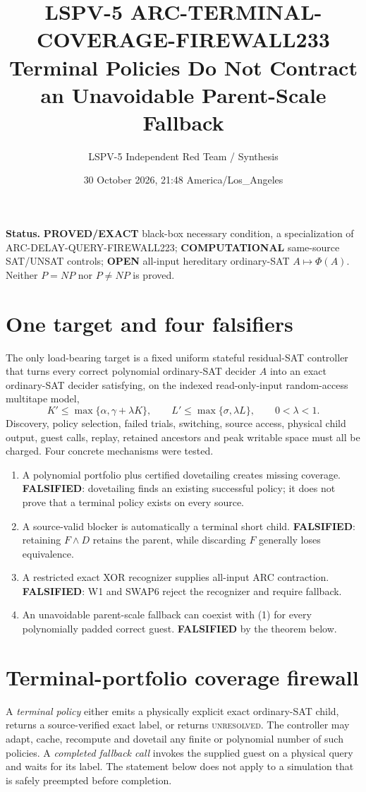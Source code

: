 \documentclass[11pt]{article}
\title{LSPV-5 ARC-TERMINAL-COVERAGE-FIREWALL233\\
Terminal Policies Do Not Contract an Unavoidable Parent-Scale Fallback}
\author{LSPV-5 Independent Red Team / Synthesis}
\date{30 October 2026, 21:48 America/Los\_Angeles}
\begin{document}
\maketitle

\noindent\textbf{Status.} \textbf{PROVED/EXACT} black-box necessary condition,
a specialization of ARC-DELAY-QUERY-FIREWALL223; \textbf{COMPUTATIONAL}
same-source SAT/UNSAT controls; \textbf{OPEN} all-input hereditary
ordinary-SAT $A\mapsto\Phi(A)$.  Neither $P=NP$ nor $P\ne NP$ is proved.

\section{One target and four falsifiers}
The only load-bearing target is a fixed uniform stateful residual-SAT controller
that turns every correct polynomial ordinary-SAT decider $A$ into an exact
ordinary-SAT decider satisfying, on the indexed read-only-input random-access
multitape model,
\[
 K'\le \max\{\alpha,\gamma+\lambda K\},\qquad
 L'\le \max\{\sigma,\lambda L\},\qquad 0<\lambda<1.              \tag{1}
\]
Discovery, policy selection, failed trials, switching, source access, physical
child output, guest calls, replay, retained ancestors and peak writable space
must all be charged.  Four concrete mechanisms were tested.
\begin{enumerate}
\item A polynomial portfolio plus certified dovetailing creates missing
coverage.  \textbf{FALSIFIED}: dovetailing finds an existing successful policy;
it does not prove that a terminal policy exists on every source.
\item A source-valid blocker is automatically a terminal short child.
\textbf{FALSIFIED}: retaining $F\wedge D$ retains the parent, while discarding
$F$ generally loses equivalence.
\item A restricted exact XOR recognizer supplies all-input ARC contraction.
\textbf{FALSIFIED}: W1 and SWAP6 reject the recognizer and require fallback.
\item An unavoidable parent-scale fallback can coexist with (1) for every
polynomially padded correct guest.  \textbf{FALSIFIED} by the theorem below.
\end{enumerate}

\section{Terminal-portfolio coverage firewall}
A \emph{terminal policy} either emits a physically explicit exact ordinary-SAT
child, returns a source-verified exact label, or returns \textsc{unresolved}.
The controller may adapt, cache, recompute and dovetail any finite or polynomial
number of such policies.  A \emph{completed fallback call} invokes the supplied
guest on a physical query and waits for its label.  The statement below does not
apply to a simulation that is safely preempted before completion.
\end{document}
